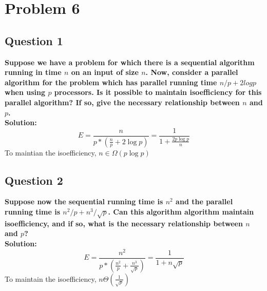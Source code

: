 \documentclass{article}
\begin{document}
\section{Problem 6}
\subsection{Question 1}
\textcolor[rgb]{0,0,1}{\textbf{Suppose we have a problem for which there is a sequential algorithm running in time $n$ on an input of size $n$. Now, consider a parallel algorithm for the problem which has parallel running time $n/p + 2log p$ when using $p$ processors. Is it possible to maintain isoefficiency for this parallel algorithm? If so, give the necessary relationship between $n$ and $p$. }}\\
\textbf{Solution: }\\
$$E=\frac{n}{p*(\frac{n}{p}+2\log p)}=\frac{1}{1+\frac{2p\log p}{n}}$$
To maintian the isoefficiency, $n\in \Omega (p\log p)$

\subsection{Question 2}
\textcolor[rgb]{0,0,1}{\textbf{Suppose now the sequential running time is $n^2$ and the parallel running time is $n^2/p + n^3/\sqrt{p}$. Can this algorithm algorithm maintain 
isoefficiency, and if so, what is the necessary relationship between $n$ and $p$?}}\\
\textbf{Solution: }\\
$$E=\frac{n^2}{p*(\frac{n^2}{p}+\frac{n^3}{\sqrt{p}})}=\frac{1}{1+n\sqrt{p}}$$
To maintain the isoefficiency, $n\Theta (\frac{1}{\sqrt{p}})$
\end{document}

